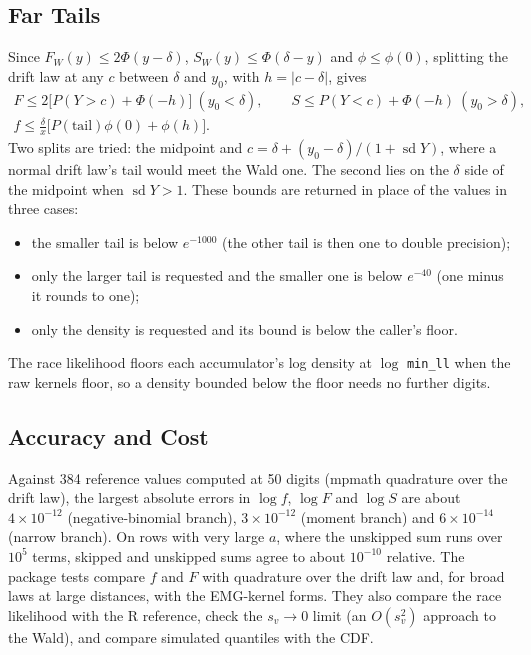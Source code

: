 \documentclass[12pt]{article}
\newcommand{\PhiN}{\Phi}
\newcommand{\phiN}{\phi}
\begin{document}
\subsection{Far Tails}
Since $F_W(y)\le2\PhiN(y-\delta)$, $S_W(y)\le\PhiN(\delta-y)$ and $\phiN\le\phiN(0)$, splitting the drift law at any $c$ between $\delta$ and $y_0$, with $h=|c-\delta|$, gives
\begin{gather*}
  F\le2\bigl[P(Y>c)+\PhiN(-h)\bigr]\ (y_0<\delta),\qquad
  S\le P(Y<c)+\PhiN(-h)\ (y_0>\delta),\\
  f\le\frac\delta x\bigl[P(\text{tail})\phiN(0)+\phiN(h)\bigr].
\end{gather*}
Two splits are tried: the midpoint and $c=\delta+(y_0-\delta)/(1+\operatorname{sd}Y)$, where a normal drift law's tail would meet the Wald one. The second lies on the $\delta$ side of the midpoint when $\operatorname{sd}Y>1$. These bounds are returned in place of the values in three cases:
\begin{itemize}
  \item the smaller tail is below $e^{-1000}$ (the other tail is then one to double precision);
  \item only the larger tail is requested and the smaller one is below $e^{-40}$ (one minus it rounds to one);
  \item only the density is requested and its bound is below the caller's floor.
\end{itemize}
The race likelihood floors each accumulator's log density at $\log$ \texttt{min\_ll} when the raw kernels floor, so a density bounded below the floor needs no further digits.

\subsection{Accuracy and Cost}
Against 384 reference values computed at 50 digits (mpmath quadrature over the drift law), the largest absolute errors in $\log f$, $\log F$ and $\log S$ are about $4\times10^{-12}$ (negative-binomial branch), $3\times10^{-12}$ (moment branch) and $6\times10^{-14}$ (narrow branch). On rows with very large $a$, where the unskipped sum runs over $10^5$ terms, skipped and unskipped sums agree to about $10^{-10}$ relative. The package tests compare $f$ and $F$ with quadrature over the drift law and, for broad laws at large distances, with the EMG-kernel forms. They also compare the race likelihood with the R reference, check the $s_v\to0$ limit (an $O(s_v^2)$ approach to the Wald), and compare simulated quantiles with the CDF.
\end{document}

